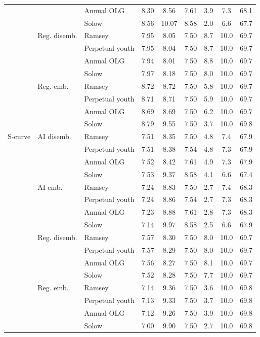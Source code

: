 \begin{tabular}{lllcccccc}
 &  & Annual OLG & 8.30 & 8.56 & 7.61 & 3.9 & 7.3 & 68.1\\
 &  & Solow & 8.56 & 10.07 & 8.58 & 2.0 & 6.6 & 67.7\\
 & Reg. disemb. & Ramsey & 7.95 & 8.05 & 7.50 & 8.7 & 10.0 & 69.7\\
 &  & Perpetual youth & 7.95 & 8.04 & 7.50 & 8.7 & 10.0 & 69.7\\
 &  & Annual OLG & 7.94 & 8.01 & 7.50 & 8.8 & 10.0 & 69.7\\
 &  & Solow & 7.97 & 8.18 & 7.50 & 8.0 & 10.0 & 69.7\\
 & Reg. emb. & Ramsey & 8.72 & 8.72 & 7.50 & 5.8 & 10.0 & 69.7\\
 &  & Perpetual youth & 8.71 & 8.71 & 7.50 & 5.9 & 10.0 & 69.7\\
 &  & Annual OLG & 8.69 & 8.69 & 7.50 & 6.2 & 10.0 & 69.7\\
 &  & Solow & 8.79 & 9.55 & 7.50 & 3.7 & 10.0 & 69.8\\
\midrule
S-curve & AI disemb. & Ramsey & 7.51 & 8.35 & 7.50 & 4.8 & 7.4 & 67.9\\
 &  & Perpetual youth & 7.51 & 8.38 & 7.54 & 4.8 & 7.3 & 67.9\\
 &  & Annual OLG & 7.52 & 8.42 & 7.61 & 4.9 & 7.3 & 67.9\\
 &  & Solow & 7.53 & 9.37 & 8.58 & 4.1 & 6.6 & 67.4\\
 & AI emb. & Ramsey & 7.24 & 8.83 & 7.50 & 2.7 & 7.4 & 68.3\\
 &  & Perpetual youth & 7.24 & 8.86 & 7.54 & 2.7 & 7.3 & 68.3\\
 &  & Annual OLG & 7.23 & 8.88 & 7.61 & 2.8 & 7.3 & 68.3\\
 &  & Solow & 7.14 & 9.97 & 8.58 & 2.5 & 6.6 & 67.9\\
 & Reg. disemb. & Ramsey & 7.57 & 8.30 & 7.50 & 8.0 & 10.0 & 69.7\\
 &  & Perpetual youth & 7.57 & 8.29 & 7.50 & 8.0 & 10.0 & 69.7\\
 &  & Annual OLG & 7.56 & 8.27 & 7.50 & 8.1 & 10.0 & 69.7\\
 &  & Solow & 7.52 & 8.28 & 7.50 & 7.7 & 10.0 & 69.7\\
 & Reg. emb. & Ramsey & 7.14 & 9.36 & 7.50 & 3.6 & 10.0 & 69.8\\
 &  & Perpetual youth & 7.13 & 9.33 & 7.50 & 3.7 & 10.0 & 69.8\\
 &  & Annual OLG & 7.12 & 9.26 & 7.50 & 3.9 & 10.0 & 69.8\\
 &  & Solow & 7.00 & 9.90 & 7.50 & 2.7 & 10.0 & 69.8\\
\bottomrule\end{tabular}
